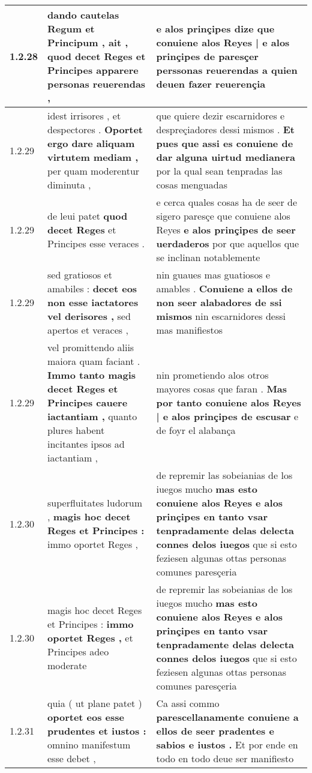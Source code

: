 \begin{tabular}{|p{1cm}|p{6.5cm}|p{6.5cm}|}
1.2.28 & dando cautelas Regum et Principum , \textbf{ ait , quod decet Reges et Principes } apparere personas reuerendas , & e alos prinçipes dize \textbf{ que conuiene alos Reyes | e alos prinçipes de paresçer } perssonas reuerendas a quien deuen fazer reuerençia \\\hline
1.2.29 & idest irrisores , et despectores . \textbf{ Oportet ergo dare aliquam virtutem mediam , } per quam moderentur diminuta , & que quiere dezir escarnidores e despreçiadores dessi mismos . \textbf{ Et pues que assi es conuiene de dar alguna uirtud medianera } por la qual sean tenpradas las cosas menguadas \\\hline
1.2.29 & de leui patet \textbf{ quod decet Reges } et Principes esse veraces . & e cerca quales cosas ha de seer de sigero paresçe que conuiene alos Reyes \textbf{ e alos prinçipes de seer uerdaderos } por que aquellos que se inclinan notablemente \\\hline
1.2.29 & sed gratiosos et amabiles : \textbf{ decet eos non esse iactatores vel derisores , } sed apertos et veraces , & nin guaues mas guatiosos e amables . \textbf{ Conuiene a ellos de non seer alabadores de ssi mismos } nin escarnidores dessi mas manifiestos \\\hline
1.2.29 & vel promittendo aliis maiora quam faciant . \textbf{ Immo tanto magis decet Reges et Principes cauere iactantiam , } quanto plures habent incitantes ipsos ad iactantiam , & nin prometiendo alos otros mayores cosas que faran . \textbf{ Mas por tanto conuiene alos Reyes | e alos prinçipes de escusar } e de foyr el alabança \\\hline
1.2.30 & superfluitates ludorum , \textbf{ magis hoc decet Reges et Principes : } immo oportet Reges , & de repremir las sobeianias de los iuegos mucho \textbf{ mas esto conuiene alos Reyes e alos prinçipes en tanto vsar tenpradamente delas delecta connes delos iuegos } que si esto feziesen algunas ottas personas comunes paresçeria \\\hline
1.2.30 & magis hoc decet Reges et Principes : \textbf{ immo oportet Reges , } et Principes adeo moderate & de repremir las sobeianias de los iuegos mucho \textbf{ mas esto conuiene alos Reyes e alos prinçipes en tanto vsar tenpradamente delas delecta connes delos iuegos } que si esto feziesen algunas ottas personas comunes paresçeria \\\hline
1.2.31 & quia ( ut plane patet ) \textbf{ oportet eos esse prudentes et iustos : } omnino manifestum esse debet , & Ca assi commo \textbf{ parescellanamente conuiene a ellos de seer pradentes e sabios e iustos . } Et por ende en todo en todo deue ser manifiesto \\\hline

\end{tabular}
